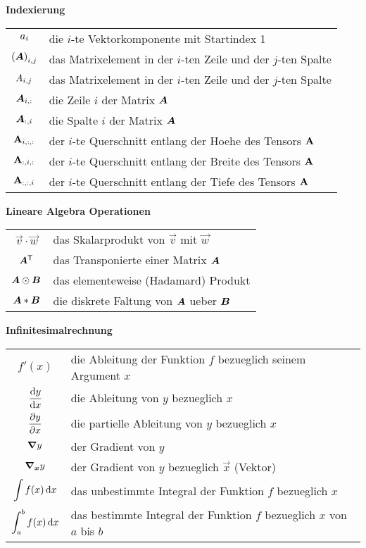 \begin{center}\textbf{Indexierung}\end{center}
\begin{tabular}{cl}
  $a_i$ & die $i$-te Vektorkomponente mit Startindex 1 \\
  ${(\bm{A})}_{i,j}$ & das Matrixelement in der $i$-ten Zeile und der $j$-ten Spalte \\
  $\mathit{A}_{i,j}$ & das Matrixelement in der $i$-ten Zeile und der $j$-ten Spalte \\
  $\bm{A}_{i,:}$ & die Zeile $i$ der Matrix $\bm{A}$ \\
  $\bm{A}_{:,i}$ & die Spalte $i$ der Matrix $\bm{A}$\ \\
  $\mathbf{A}_{i,:,:}$ & der $i$-te Querschnitt entlang der Hoehe des Tensors $\mathbf{A}$ \\
  $\mathbf{A}_{:,i,:}$ & der $i$-te Querschnitt entlang der Breite des Tensors $\mathbf{A}$ \\
  $\mathbf{A}_{:,:,i}$ & der $i$-te Querschnitt entlang der Tiefe des Tensors $\mathbf{A}$ \\

\end{tabular}

\begin{center}\textbf{Lineare Algebra Operationen}\end{center}
\begin{tabular}{cl}
  $\vec{v} \cdot \vec{w}$ & das Skalarprodukt von $\vec{v}$ mit $\vec{w}$ \\
  $\bm{A}^{\mathsf{T}}$ & das Transponierte einer Matrix $\bm{A}$ \\
  $\bm{A} \odot \bm{B}$ & das elementeweise (Hadamard) Produkt \\
  $\bm{A} * \bm{B}$ & die diskrete Faltung von $\bm{A}$ ueber $\bm{B}$

\end{tabular}

\begin{center}\textbf{Infinitesimalrechnung}\end{center}
\begin{tabular}{cl}
  $f'(x)$ & die Ableitung der Funktion $f$ bezueglich seinem Argument $x$ \\
  $\displaystyle\frac{\text{d}y}{\text{d}x}$ & die Ableitung von $y$ bezueglich $x$ \\[2ex]
  $\displaystyle\frac{\partial y}{\partial x}$ & die partielle Ableitung von $y$ bezueglich $x$ \\[2ex]
  $\bm{\nabla} y$ & der Gradient von $y$\\
  $\bm{\nabla}_{\bm{x}}y$ & der Gradient von $y$ bezueglich $\vec{x}$ (Vektor) \\
  $\displaystyle\int f(x)\,\text{d}x$ & das unbestimmte Integral der Funktion $f$ bezueglich $x$ \\
  $\displaystyle\int_a^b f(x)\,\text{d}x$ & das bestimmte Integral der Funktion $f$ bezueglich $x$ von $a$ bis $b$ \\

\end{tabular}

